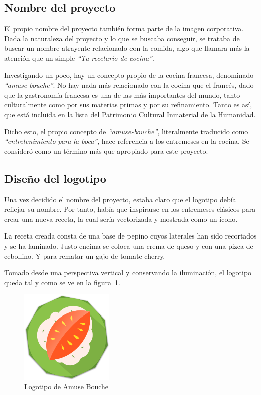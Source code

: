 \subsection{Nombre del proyecto}

El propio nombre del proyecto también forma parte de la imagen corporativa. Dada
la naturaleza del proyecto y lo que se buscaba conseguir, se trataba de buscar
un nombre atrayente relacionado con la comida, algo que llamara más la atención
que un simple \textit{``Tu recetario de cocina''}.

Investigando un poco, hay un concepto propio de la cocina
francesa,\cite{gastronomia-francia} denominado \textit{``amuse-bouche''}. No hay
nada más relacionado con la cocina que el francés, dado que la gastronomía
francesa es una de las más importantes del mundo, tanto culturalmente como por
sus materias primas y por su refinamiento. Tanto es así, que está incluida en la
lista del Patrimonio Cultural Inmaterial de la Humanidad.

Dicho esto, el propio concepto de \textit{``amuse-bouche''}, literalmente
traducido como \textit{``entretenimiento para la boca''},\cite{amuse-bouche}
hace referencia a los entremeses en la cocina. Se consideró como un término más
que apropiado para este proyecto.


\subsection{Diseño del logotipo}

Una vez decidido el nombre del proyecto, estaba claro que el logotipo debía
reflejar su nombre. Por tanto, había que inspirarse en los entremeses clásicos
para crear una nueva receta, la cual sería vectorizada y mostrada como un icono.

La receta creada consta de una base de pepino cuyos laterales han sido
recortados y se ha laminado. Justo encima se coloca una crema de queso y
con una pizca de cebollino. Y para rematar un gajo de tomate cherry.

Tomado desde una perspectiva vertical y conservando la iluminación, el logotipo
queda tal y como se ve en la figura~\ref{fig:logotipo}.

\begin{figure}[htbp]
  \centering
  \includegraphics[width=0.4\textwidth]{cap5/img/logotipo}
  \caption{Logotipo de Amuse Bouche}
  \label{fig:logotipo}
\end{figure}



